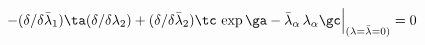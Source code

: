 \begin{equation}
 -(\delta/{\delta{\bar\lambda}_1})\ta (\delta/{\delta{\lambda}_2})+
(\delta/{\delta{\bar\lambda}_2}) \tc\,\exp\ga
 -{\bar\lambda}_\alpha\,\lambda_\alpha\gc\Bigr|_{(\lambda={\bar\lambda}
=0)}=0
\end{equation}

